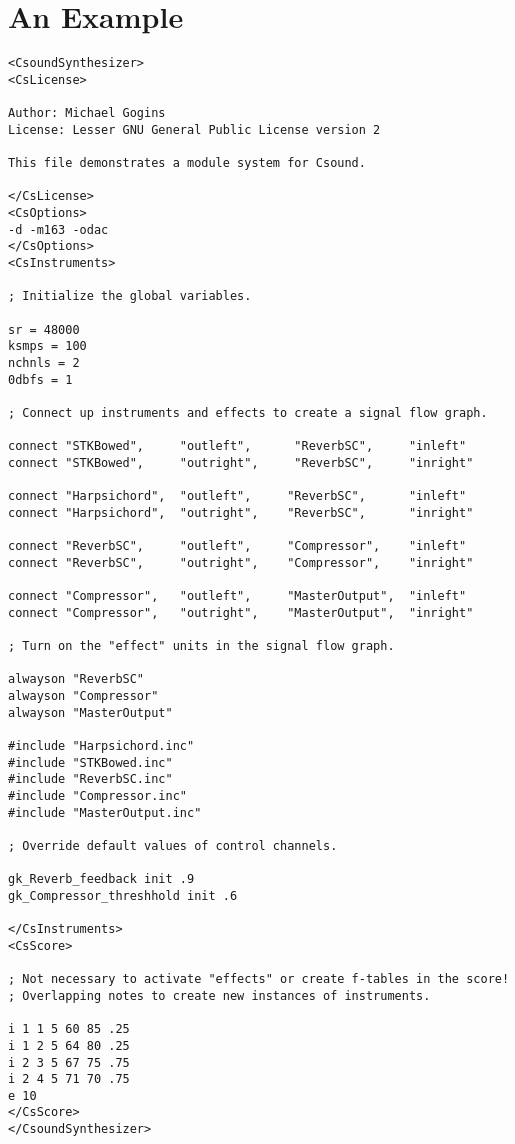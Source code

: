 \documentclass[12pt,letterpaper,onecolumn]{scrartcl}
\begin{document}
\section{An Example}
\label{sec:AnExample}

\begin{lstlisting}
<CsoundSynthesizer>
<CsLicense>

Author: Michael Gogins
License: Lesser GNU General Public License version 2

This file demonstrates a module system for Csound.

</CsLicense>
<CsOptions>
-d -m163 -odac
</CsOptions>
<CsInstruments>

; Initialize the global variables.

sr = 48000
ksmps = 100
nchnls = 2
0dbfs = 1

; Connect up instruments and effects to create a signal flow graph.

connect "STKBowed",     "outleft",      "ReverbSC",     "inleft"
connect "STKBowed",     "outright",     "ReverbSC",     "inright"

connect "Harpsichord",  "outleft",     "ReverbSC",     	"inleft"
connect "Harpsichord",  "outright",    "ReverbSC",     	"inright"

connect "ReverbSC", 	"outleft",     "Compressor",    "inleft"
connect "ReverbSC", 	"outright",    "Compressor",    "inright"

connect "Compressor",   "outleft",     "MasterOutput",  "inleft"
connect "Compressor",   "outright",    "MasterOutput",  "inright"

; Turn on the "effect" units in the signal flow graph.

alwayson "ReverbSC"
alwayson "Compressor"
alwayson "MasterOutput"

#include "Harpsichord.inc"
#include "STKBowed.inc"
#include "ReverbSC.inc"
#include "Compressor.inc"
#include "MasterOutput.inc"

; Override default values of control channels.

gk_Reverb_feedback init .9
gk_Compressor_threshhold init .6

</CsInstruments>
<CsScore>

; Not necessary to activate "effects" or create f-tables in the score!
; Overlapping notes to create new instances of instruments.

i 1 1 5 60 85 .25
i 1 2 5 64 80 .25
i 2 3 5 67 75 .75
i 2 4 5 71 70 .75
e 10
</CsScore>
</CsoundSynthesizer>
\end{lstlisting}
\end{document}
